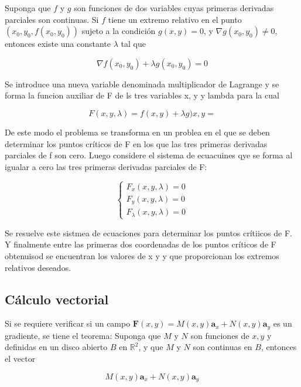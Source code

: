 Suponga que $f$ y $g$ son funciones de dos variables cuyas primeras derivadas parciales son continuas. Si $f$ tiene un extremo relativo en el punto $(x_0,y_0,f(x_0,y_0))$ sujeto a la condición $g(x,y)=0$, y $\nabla g(x_0,y_0)\neq 0$, entonces existe una constante $\lambda$ tal que

\begin{equation*}
\nabla f(x_0,y_0) + \lambda g (x_0,y_0) = 0
\end{equation*}

Se introduce una nueva variable denominada multiplicador de Lagrange y se forma la funcion auxiliar de F de ls tres variables x, y y lambda para la cual 

\begin{equation*}
F(x,y,\lambda) = f(x,y)+ \lambda g)x,y=
\end{equation*}

De este modo el problema se transforma en un problea en el que se deben determinar los puntos críticos de F en los que las tres primeras derivadas parciales de f son cero. Luego considere el sistema de ecuacuines qye se forma al igualar a cero las tres primeras derivadas parciales de F:

\begin{equation*}
\left\{
\begin{aligned}
 F_x(x,y,\lambda) = 0 \\   
 F_y(x,y,\lambda) = 0 \\   
 F_\lambda(x,y,\lambda) = 0    
\end{aligned}
\right.
\end{equation*}

Se resuelve este sistmea de ecuaciones para determinar los puntos crítiicos de F. Y finalmente entre las primeras dos coordenadas de los puntos críticos de F obtenuisod se encuentran los valores de x y y que proporcionan los extremos relativos deseados.


\subsection{Cálculo vectorial}

Si se requiere verificar si un campo $\mathbf{F}(x,y)=M(x,y)\mathbf{a}_x + N(x,y)\mathbf{a}_y$ es un gradiente, se tiene el teorema: Suponga que $M$ y $N$ son funciones de $x,y$ y definidas en un disco abierto $B$ en $\mathbb{R}^2$, y que $M$ y $N$ son continuas en $B$, entonces el vector

\begin{equation*}
M(x,y)\mathbf{a}_x + N(x,y)\mathbf{a}_y
\end{equation*}

